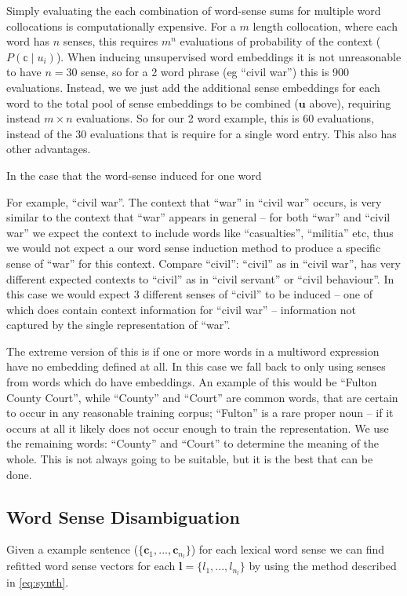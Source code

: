 \documentclass{sig-alternate}
\renewcommand{\c}{\mathbf{c}}
\renewcommand{\l}{\mathbf{l}}
\renewcommand{\u}{\mathbf{u}}
\begin{document}
Simply evaluating the each combination of word-sense sums for multiple word collocations is computationally expensive. For a $m$ length collocation, where each word has $n$ senses, this requires $m^n$ evaluations of probability of the context ($P(\mathbb{c}\mid u_i)$). When inducing unsupervised word embeddings it is not unreasonable to have $n=30$ sense, so for a 2 word phrase (eg ``civil war'') this is 900 evaluations.
Instead, we we just add the additional sense embeddings for each word to the total pool of sense embeddings to be combined ($\u$ above), requiring instead $m \times n$ evaluations. So for our 2 word example, this is 60 evaluations, instead of the 30 evaluations that is require for a single word entry. This also has other advantages.


In the case that the word-sense induced for one word 

For example, ``civil war''. The context that ``war'' in ``civil war'' occurs, is very similar to the context that ``war'' appears in general -- for both ``war'' and ``civil war'' we expect the context to include words like ``casualties'', ``militia'' etc, thus we would not expect a our word sense induction method to produce a specific sense of ``war'' for this context.
Compare ``civil'': ``civil'' as in ``civil war'', has very different expected contexts to ``civil'' as in ``civil servant'' or ``civil behaviour''. In this case we would expect 3 different senses of ``civil'' to be induced -- one of which does contain context information for ``civil war'' -- information not captured by the single representation of ``war''.

The extreme version of this is if one or more words in a multiword expression have no embedding defined at all. In this case we fall back to only using senses from words which do have embeddings. An example of this would be ``Fulton County Court'', while ``County'' and ``Court'' are common words, that are certain to occur in any reasonable training corpus; ``Fulton'' is a rare proper noun -- if it occurs at all it likely does not occur enough to train the representation. We use the remaining words: ``County'' and ``Court'' to determine the meaning of the whole. This is not always going to be suitable, but it is the best that can be done.


\subsection{Word Sense Disambiguation}
Given a example sentence ($\{\c_1,...,\c_{n_l}\}$) for each lexical word sense we can find refitted word sense vectors for each $\l=\{l_1,..., l_{n_l}\}$ by using the method described in \cref{eq:synth}. 
\end{document}

